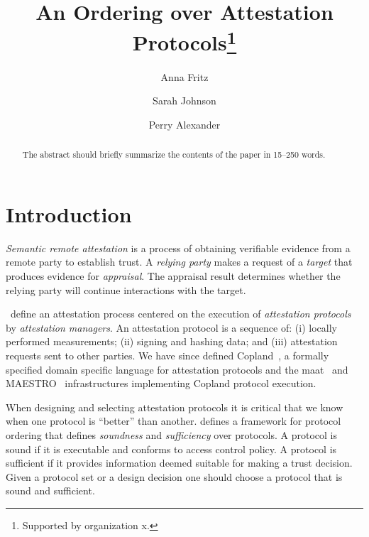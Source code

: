 \documentclass[runningheads]{llncs}
\theoremstyle{definition}
\begin{document}
%
\title{An Ordering over Attestation Protocols\thanks{Supported by organization x.}}
%
%
\author{Anna Fritz \and
Sarah Johnson \and
Perry Alexander}
%
%
%
\maketitle              %
%
\begin{abstract}
The abstract should briefly summarize the contents of the paper in
15--250 words.

\end{abstract}
%
%
%
\section{Introduction}

\emph{Semantic remote
  attestation}\citep{Haldar:04:Semantic-Remote,coker2011principles} is
a process of obtaining verifiable evidence from a remote party to
establish trust.  A \emph{relying party} makes a request of a
\emph{target} that produces evidence for \emph{appraisal}. The
appraisal result determines whether the relying party will continue
interactions with the target.

\citet{Coker::Principles-of-R}~define an attestation process centered
on the execution of \emph{attestation protocols} by \emph{attestation
  managers}.  An attestation protocol is a sequence of: (i) locally
performed measurements; (ii) signing and hashing data; and (iii)
attestation requests sent to other parties.  We have since defined
Copland~\citep{Rowe:2019:Orchestrating}, a formally specified domain
specific language for attestation protocols and the
maat~\citep{Pendergrass:2018:Maat} and
MAESTRO~\citep{Petz:2021:faithful} infrastructures implementing
Copland protocol execution.

When designing and selecting attestation protocols it is critical that
we know when one protocol is ``better'' than another.
\citet{Fritz:2023:framework} defines a framework for protocol ordering
that defines \emph{soundness} and \emph{sufficiency} over protocols.
A protocol is sound if it is executable and conforms to access control
policy.  A protocol is sufficient if it provides information deemed
suitable for making a trust decision.  Given a protocol set or a
design decision one should choose a protocol that is sound and
sufficient.
\end{document}
